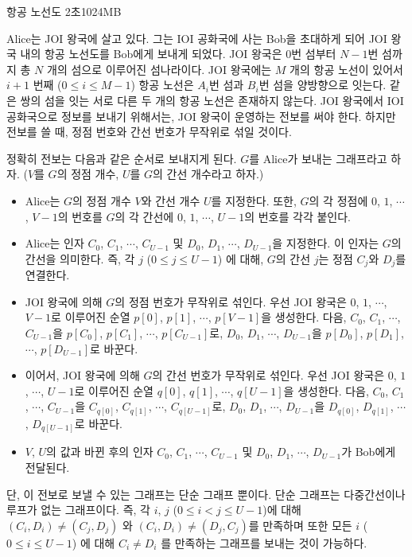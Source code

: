 \begin{problem}{항공 노선도}
	{}{}
	{2초}{1024MB}{}
	
	Alice는 JOI 왕국에 살고 있다. 그는 IOI 공화국에 사는 Bob을 초대하게 되어 JOI 왕국 내의 항공 노선도를 Bob에게 보내게 되었다. JOI 왕국은 0번 섬부터 $N-1$번 섬까지 총 $N$ 개의 섬으로 이루어진 섬나라이다. JOI 왕국에는 $M$ 개의 항공 노선이 있어서 $i+1$ 번째 ($0 \le i \le M-1$) 항공 노선은 $A_i$번 섬과 $B_i$번 섬을 양방향으로 잇는다. 같은 쌍의 섬을 잇는 서로 다른 두 개의 항공 노선은 존재하지 않는다. JOI 왕국에서 IOI 공화국으로 정보를 보내기 위해서는, JOI 왕국이 운영하는 전보를 써야 한다. 하지만 전보를 쓸 때, 정점 번호와 간선 번호가 무작위로 섞일 것이다.
	
	정확히 전보는 다음과 같은 순서로 보내지게 된다. $G$를 Alice가 보내는 그래프라고 하자. ($V$를 $G$의 정점 개수, $U$를 $G$의 간선 개수라고 하자.)
	
	\begin{itemize}
		\item Alice는 $G$의 정점 개수 $V$와 간선 개수 $U$를 지정한다. 또한, $G$의 각 정점에 $0$, $1$, $\cdots$, $V-1$의 번호를 $G$의 각 간선에 $0$, $1$, $\cdots$, $U-1$의 번호를 각각 붙인다.
		\item Alice는 인자 $C_0$, $C_1$, $\cdots$, $C_{U-1}$ 및 $D_0$, $D_1$, $\cdots$, $D_{U-1}$을 지정한다. 이 인자는 $G$의 간선을 의미한다. 즉, 각 $j$ ($0 \le j \le U-1$) 에 대해, $G$의 간선 $j$는 정점 $C_j$와 $D_j$를 연결한다.
		\item JOI 왕국에 의해 $G$의 정점 번호가 무작위로 섞인다. 우선 JOI 왕국은 $0$, $1$, $\cdots$, $V-1$로 이루어진 순열 $p[0]$, $p[1]$, $\cdots$, $p[V-1]$을 생성한다. 다음, $C_0$, $C_1$, $\cdots$, $C_{U-1}$을 $p[C_0]$, $p[C_1]$, $\cdots$, $p[C_{U-1}]$로, $D_0$, $D_1$, $\cdots$, $D_{U-1}$을 $p[D_0]$, $p[D_1]$, $\cdots$, $p[D_{U-1}]$로 바꾼다.
		\item 이어서, JOI 왕국에 의해 $G$의 간선 번호가 무작위로 섞인다. 우선 JOI 왕국은 $0$, $1$, $\cdots$, $U-1$로 이루어진 순열 $q[0]$, $q[1]$, $\cdots$, $q[U-1]$을 생성한다. 다음, $C_0$, $C_1$, $\cdots$, $C_{U-1}$을 $C_{q[0]}$, $C_{q[1]}$, $\cdots$, $C_{q[U-1]}$로, $D_0$, $D_1$, $\cdots$, $D_{U-1}$을 $D_{q[0]}$, $D_{q[1]}$, $\cdots$, $D_{q[U-1]}$로 바꾼다.
		\item $V$, $U$의 값과 바뀐 후의 인자 $C_0$, $C_1$, $\cdots$, $C_{U-1}$ 및 $D_0$, $D_1$, $\cdots$, $D_{U-1}$가 Bob에게 전달된다.
	\end{itemize}

	단, 이 전보로 보낼 수 있는 그래프는 단순 그래프 뿐이다. 단순 그래프는 다중간선이나 루프가 없는 그래프이다. 즉, 각 $i$, $j$ ($0 \le i < j \le U-1$)에 대해 $(C_i, D_i) \ne (C_j, D_j)$ 와 $(C_i, D_i) \ne (D_j, C_j)$를 만족하며 또한 모든 $i$ ($0 \le i \le U-1$) 에 대해 $C_i \ne D_i$ 를 만족하는 그래프를 보내는 것이 가능하다.
	

\end{problem}
